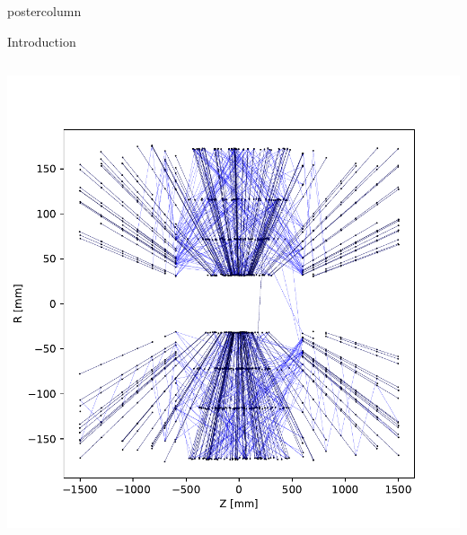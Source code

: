 \documentclass[final,hyperref={pdfpagelabels=false}]{beamer}
\begin{document}
\begin{frame}
\begin{columns}
\begin{column}{.33\textwidth}
\begin{beamercolorbox}[center,wd=\textwidth]{postercolumn}
\begin{minipage}[T]{.95\textwidth}
{\begin{block}{Introduction}
\begin{columns}
\begin{column}{.49\textwidth}
\begin{center}
                  \includegraphics[width=0.85\linewidth]{figures/event000001000_section0_rz.pdf}
                \end{center}
              \end{column}
              \end{columns}
            \end{block}\vspace{-2cm}
            
}
\end{minipage}
\end{beamercolorbox}
\end{column}
\end{columns}
\end{frame}
\end{document}

